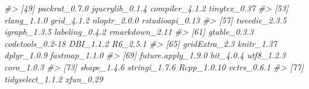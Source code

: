 \documentclass[
]{article}
\newenvironment{Shaded}{\begin{snugshade}}{\end{snugshade}}
\newcommand{\CommentTok}[1]{\textcolor[rgb]{0.56,0.35,0.01}{\textit{#1}}}
\begin{document}
\begin{Shaded}
\begin{Highlighting}[]
\CommentTok{#> [49] packrat_0.7.0         jquerylib_0.1.4       compiler_4.1.2        tinytex_0.37         }
\CommentTok{#> [53] rlang_1.1.0           grid_4.1.2            nloptr_2.0.0          rstudioapi_0.13      }
\CommentTok{#> [57] tweedie_2.3.5         igraph_1.3.5          labeling_0.4.2        rmarkdown_2.11       }
\CommentTok{#> [61] gtable_0.3.3          codetools_0.2-18      DBI_1.1.2             R6_2.5.1             }
\CommentTok{#> [65] gridExtra_2.3         knitr_1.37            dplyr_1.0.9           fastmap_1.1.0        }
\CommentTok{#> [69] future.apply_1.9.0    bit_4.0.4             utf8_1.2.3            coro_1.0.3           }
\CommentTok{#> [73] shape_1.4.6           stringi_1.7.6         Rcpp_1.0.10           vctrs_0.6.1          }
\CommentTok{#> [77] tidyselect_1.1.2      xfun_0.29}
\end{Highlighting}
\end{Shaded}
\end{document}

